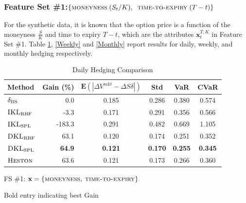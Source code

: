 \documentclass[letterpaper,12pt,titlepage,oneside,final]{book}
\numberwithin{equation}{section}
\theoremstyle{definition}
\newcommand{\vx}{\mathbf{x}}
\newcommand{\E}{\mathbf{E}}
\newcommand{\DS}{\Delta S}
\newcommand{\Heston}{\textsc{Heston}}
\newcommand{\DVmkt}{\Delta V^{mkt}}
\newcommand{\MeanAbs}{\E(|\DVmkt-\DS \delta |)}
\newcommand{\DKLs}{\bf\textsc{DKL}_{\text{SPL}}}
\newcommand{\DKLg}{\bf\textsc{DKL}_{\text{RBF}}}
\newcommand{\IKLs}{\bf\textsc{IKL}_{\text{SPL}}}
\newcommand{\IKLg}{\bf\textsc{IKL}_{\text{RBF}}}
\newcommand{\Del}{\delta_{\textsc{BS}}}
\begin{document}
\subsubsection{Feature Set \#1:$ \{\textsc{moneyness} \;(S_t/K),\;\;\textsc{time-to-expiry} \;(T-t)\}$}
For the synthetic data, it is known that the option price is a function of
 the moneyness $ \frac{S}{K}$ and time to expiry $T-t$, which are the attributes $\vx_{t}^{T,K}$ in Feature Set \#1. Table \ref{Daily}, \ref{Weekly} and \ref{Monthly} report results for daily, weekly, and monthly hedging respectively.

 \begin{table}[htp!]
\begin{center}
\begin{threeparttable}
\begin{tabular}{|l|r c c c c|}
\hline
Method & Gain (\%)& $\MeanAbs$ & Std& VaR & CVaR   \\ \hline
$\Del$ & 0.0 & 0.185 & 0.286 & 0.380 & 0.574 \\
$\IKLg$  & -3.3 & 0.171 & 0.291 & 0.356 & 0.566 \\
$\IKLs$  & -183.3 & 0.291 & 0.482 & 0.669 & 1.105 \\
$\DKLg$  & 63.1 & 0.120 & 0.174 & 0.251 & 0.352 \\
$\DKLs$  & \textbf{64.9} & \textbf{0.121} & \textbf{0.170} & \textbf{0.255} & \textbf{0.345} \\
$\Heston$ & 63.6 & 0.121 & 0.173 & 0.266 & 0.360 \\
\hline
\end{tabular}
\caption{Daily Hedging Comparison}
\label{Daily}
 \begin{tablenotes}
    \small
  \item[1] FS \#1: $\vx=\{\textsc{moneyness,~time-to-expiry}\}$
  \item[2] Bold entry indicating best Gain
  \end{tablenotes}
  \end{threeparttable}
\end{center}
\end{table}
\end{document}
